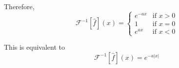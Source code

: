 \documentclass[letterpaper, 12pt]{article}
\theoremstyle{custom}
\begin{document}
Therefore,
\[
  \mathcal{F}^{-1}  \left[ \hat{f} \right] \left( x \right)  =
  \begin{cases}
    e^{-a x} & \text{if } x>0 \\
    1 & \text{if } x=0\\
    e^{a x} & \text{if } x<0
  \end{cases}
\]

This is equivalent to
\begin{equation*}
  \mathcal{F}^{-1}  \left[ \hat{f} \right] \left( x \right)  = e^{-a|x|}
\end{equation*}
\end{document}
